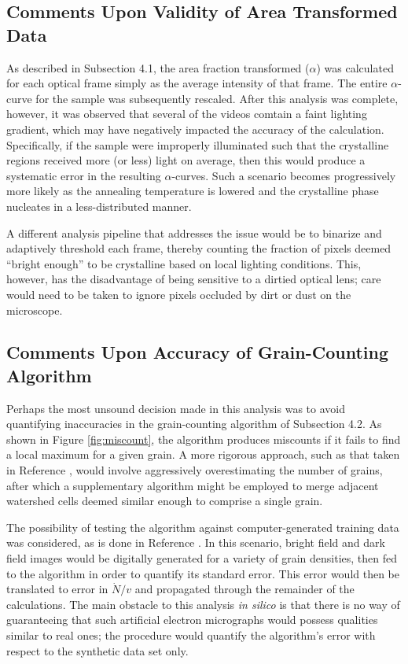 \subsection{Comments Upon Validity of Area Transformed Data}

As described in Subsection 4.1, the area fraction transformed ($\alpha$) was calculated for each optical frame simply as the average intensity of that frame.  The entire $\alpha$-curve for the sample was subsequently rescaled.  After this analysis was complete, however, it was observed that several of the videos comtain a faint lighting gradient, which may have negatively impacted the accuracy of the calculation.  Specifically, if the sample were improperly illuminated such that the crystalline regions received more (or less) light on average, then this would produce a systematic error in the resulting $\alpha$-curves.  Such a scenario becomes progressively more likely as the annealing temperature is lowered and the crystalline phase nucleates in a less-distributed manner.

A different analysis pipeline that addresses the issue would be to binarize and adaptively threshold each frame, thereby counting the fraction of pixels deemed ``bright enough'' to be crystalline based on local lighting conditions.  This, however, has the disadvantage of being sensitive to a dirtied optical lens; care would need to be taken to ignore pixels occluded by dirt or dust on the microscope. 

\subsection{Comments Upon Accuracy of Grain-Counting Algorithm}

Perhaps the most unsound decision made in this analysis was to avoid quantifying inaccuracies in the grain-counting algorithm of Subsection 4.2.  As shown in Figure \ref{fig:miscount}, the algorithm produces miscounts if it fails to find a local maximum for a given grain.  A more rigorous approach, such as that taken in Reference \cite{campbell:2018}, would involve aggressively overestimating the number of grains, after which a supplementary algorithm might be employed to merge adjacent watershed cells deemed similar enough to comprise a single grain.

The possibility of testing the algorithm against computer-generated training data was considered, as is done in Reference \cite{chan:2020}.  In this scenario, bright field and dark field images would be digitally generated for a variety of grain densities, then fed to the algorithm in order to quantify its standard error.  This error would then be translated to error in $\dot{N}/v$ and propagated through the remainder of the calculations.  The main obstacle to this analysis \textit{in silico} is that there is no way of guaranteeing that such artificial electron micrographs would possess qualities similar to real ones; the procedure would quantify the algorithm's error with respect to the synthetic data set only.

